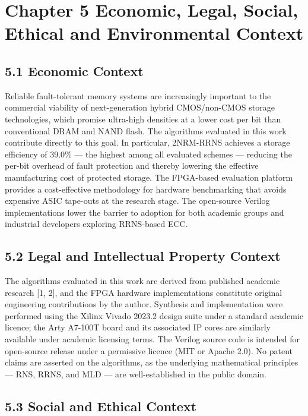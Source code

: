 \documentclass[
  english,
  12pt,
]{report}
\begin{document}
\chapter{Chapter 5 Economic, Legal, Social, Ethical and Environmental
Context}\label{chapter-5-economic-legal-social-ethical-and-environmental-context}

\section{5.1 Economic Context}\label{economic-context}

Reliable fault-tolerant memory systems are increasingly important to the
commercial viability of next-generation hybrid CMOS/non-CMOS storage
technologies, which promise ultra-high densities at a lower cost per bit
than conventional DRAM and NAND flash. The algorithms evaluated in this
work contribute directly to this goal. In particular, 2NRM-RRNS achieves
a storage efficiency of 39.0\% --- the highest among all evaluated
schemes --- reducing the per-bit overhead of fault protection and
thereby lowering the effective manufacturing cost of protected storage.
The FPGA-based evaluation platform provides a cost-effective methodology
for hardware benchmarking that avoids expensive ASIC tape-outs at the
research stage. The open-source Verilog implementations lower the
barrier to adoption for both academic groups and industrial developers
exploring RRNS-based ECC.

\section{5.2 Legal and Intellectual Property
Context}\label{legal-and-intellectual-property-context}

The algorithms evaluated in this work are derived from published
academic research {[}1, 2{]}, and the FPGA hardware implementations
constitute original engineering contributions by the author. Synthesis
and implementation were performed using the Xilinx Vivado 2023.2 design
suite under a standard academic licence; the Arty A7-100T board and its
associated IP cores are similarly available under academic licensing
terms. The Verilog source code is intended for open-source release under
a permissive licence (MIT or Apache 2.0). No patent claims are asserted
on the algorithms, as the underlying mathematical principles --- RNS,
RRNS, and MLD --- are well-established in the public domain.

\section{5.3 Social and Ethical
Context}\label{social-and-ethical-context}
\end{document}
